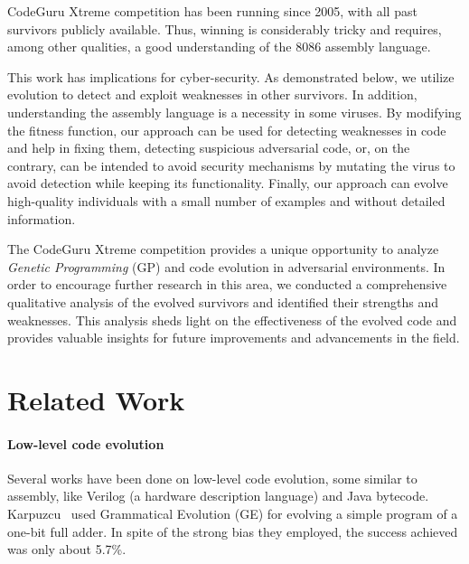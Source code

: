 \documentclass[dvipsnames, format=sigconf]{acmart}
\begin{document}
CodeGuru Xtreme competition has been running since 2005, with all past survivors publicly available. Thus, winning is considerably tricky and requires, among other qualities, a good understanding of the 8086 assembly language. %

This work has implications for cyber-security. As demonstrated below, we utilize evolution to detect and exploit weaknesses in other survivors. In addition, understanding the assembly language is a necessity in some viruses. By modifying the fitness function, our approach can be used for detecting weaknesses in code and help in fixing them, detecting suspicious adversarial code, or, on the contrary, can be intended to avoid security mechanisms by mutating the virus to avoid detection while keeping its functionality. Finally, our approach can evolve high-quality individuals with a small number of examples and without detailed information. 

The CodeGuru Xtreme competition provides a unique opportunity to analyze \textit{Genetic Programming} (GP) and code evolution in adversarial environments. In order to encourage further research in this area, we conducted a comprehensive qualitative analysis of the evolved survivors and identified their strengths and weaknesses. This analysis sheds light on the effectiveness of the evolved code and provides valuable insights for future improvements and advancements in the field.

\section{Related Work}
\label{sec:related-work}
\paragraph{Low-level code evolution}
Several works have been done on low-level code evolution, some similar to assembly, like Verilog (a hardware description language) and Java bytecode. Karpuzcu~\cite{ulya2005automatic} used Grammatical Evolution (GE) for evolving a simple program of a one-bit full adder. %
In spite of the strong bias they employed, the success achieved was only about 5.7\%. 
\end{document}
